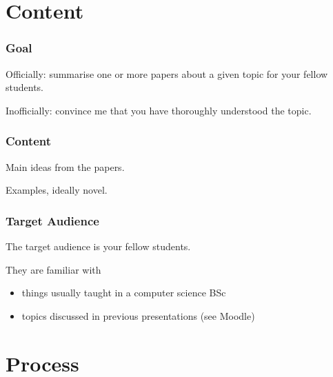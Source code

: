 \section{Content}

\begin{frame}
  \frametitle{Goal}

  Officially: summarise one or more papers about a given topic for your fellow students.

  \medskip
  \pause

  Inofficially: convince me that you have thoroughly understood the topic.
\end{frame}

\begin{frame}
  \frametitle{Content}

  Main ideas from the papers.

  \medskip
  \pause

  Examples, ideally novel.
\end{frame}

\begin{frame}
  \frametitle{Target Audience}

  The target audience is your fellow students.

  \medskip
  \pause

  They are familiar with
  \begin{itemize}
    \item things usually taught in a computer science BSc
    \item topics discussed in previous presentations (see Moodle)
  \end{itemize}
\end{frame}

\section{Process}

